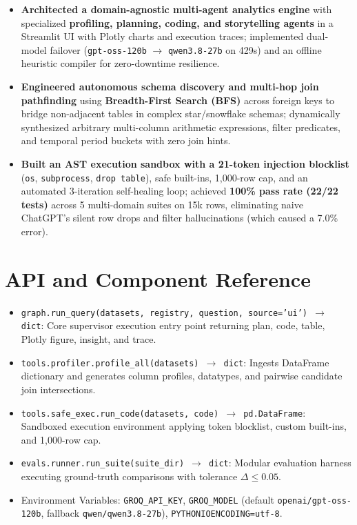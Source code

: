 \documentclass[11pt,a4paper]{article}
\begin{document}
\begin{itemize}[leftmargin=0.6cm,itemsep=2pt]
\item \textbf{Architected a domain-agnostic multi-agent analytics engine} with specialized \textbf{profiling, planning, coding, and storytelling agents} in a Streamlit UI with Plotly charts and execution traces; implemented dual-model failover (\texttt{gpt-oss-120b} $\rightarrow$ \texttt{qwen3.8-27b} on 429s) and an offline heuristic compiler for zero-downtime resilience.
\item \textbf{Engineered autonomous schema discovery and multi-hop join pathfinding} using \textbf{Breadth-First Search (BFS)} across foreign keys to bridge non-adjacent tables in complex star/snowflake schemas; dynamically synthesized arbitrary multi-column arithmetic expressions, filter predicates, and temporal period buckets with zero join hints.
\item \textbf{Built an AST execution sandbox with a 21-token injection blocklist} (\texttt{os}, \texttt{subprocess}, \texttt{drop table}), safe built-ins, 1,000-row cap, and an automated 3-iteration self-healing loop; achieved \textbf{100\% pass rate (22/22 tests)} across 5 multi-domain suites on 15k rows, eliminating naive ChatGPT's silent row drops and filter hallucinations (which caused a 7.0\% error).
\end{itemize}

\appendix
\section{API and Component Reference}
\begin{itemize}[leftmargin=0.8cm]
\item \texttt{graph.run\_query(datasets, registry, question, source='ui') $\rightarrow$ dict}: Core supervisor execution entry point returning plan, code, table, Plotly figure, insight, and trace.
\item \texttt{tools.profiler.profile\_all(datasets) $\rightarrow$ dict}: Ingests DataFrame dictionary and generates column profiles, datatypes, and pairwise candidate join intersections.
\item \texttt{tools.safe\_exec.run\_code(datasets, code) $\rightarrow$ pd.DataFrame}: Sandboxed execution environment applying token blocklist, custom built-ins, and 1,000-row cap.
\item \texttt{evals.runner.run\_suite(suite\_dir) $\rightarrow$ dict}: Modular evaluation harness executing ground-truth comparisons with tolerance $\Delta \le 0.05$.
\item Environment Variables: \texttt{GROQ\_API\_KEY}, \texttt{GROQ\_MODEL} (default \texttt{openai/gpt-oss-120b}, fallback \texttt{qwen/qwen3.8-27b}), \texttt{PYTHONIOENCODING=utf-8}.
\end{itemize}
\end{document}
